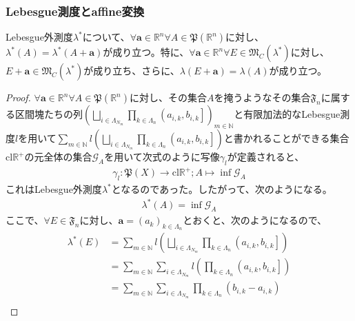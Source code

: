 \documentclass[dvipdfmx]{jsarticle}
\begin{document}
\subsubsection{Lebesgue測度とaffine変換}%
\begin{thm}\label{4.5.4.20}
Lebesgue外測度$\lambda^{*}$について、$\forall\mathbf{a} \in \mathbb{R}^{n}\forall A \in \mathfrak{P}\left( \mathbb{R}^{n} \right)$に対し、$\lambda^{*}(A) = \lambda^{*}\left( A + \mathbf{a} \right)$が成り立つ。特に、$\forall\mathbf{a} \in \mathbb{R}^{n}\forall E \in \mathfrak{M}_{C}\left( \lambda^{*} \right)$に対し、$E + \mathbf{a} \in \mathfrak{M}_{C}\left( \lambda^{*} \right)$が成り立ち、さらに、$\lambda\left( E + \mathbf{a} \right) = \lambda(A)$が成り立つ。
\end{thm}
\begin{proof}
$\forall\mathbf{a} \in \mathbb{R}^{n}\forall A \in \mathfrak{P}\left( \mathbb{R}^{n} \right)$に対し、その集合$A$を掩うようなその集合$\mathfrak{F}_{n}$に属する区間塊たちの列$\left( \bigsqcup_{i \in \varLambda_{N_{m}}} {\prod_{k \in \varLambda_{n}} \left( a_{i,k},b_{i,k} \right]} \right)_{m \in \mathbb{N}}$と有限加法的なLebesgue測度$l$を用いて$\sum_{m \in \mathbb{N}} {l\left( \bigsqcup_{i \in \varLambda_{N_{m}}} {\prod_{k \in \varLambda_{n}} \left( a_{i,k},b_{i,k} \right]} \right)}$と書かれることができる集合$\mathrm{cl}\mathbb{R}^{+}$の元全体の集合$\mathcal{G}_{A}$を用いて次式のように写像$\gamma_{l}$が定義されると、
\begin{align*}
\gamma_{l}\mathfrak{:P}(X) \rightarrow \mathrm{cl}\mathbb{R}^{+};A \mapsto \inf\mathcal{G}_{A}
\end{align*}
これはLebesgue外測度$\lambda^{*}$となるのであった。したがって、次のようになる。
\begin{align*}
\lambda^{*}(A) = \inf\mathcal{G}_{A}
\end{align*}
ここで、$\forall E \in \mathfrak{F}_{n}$に対し、$\mathbf{a} = \left( a_{k} \right)_{k \in \varLambda_{n}}$とおくと、次のようになるので、
\begin{align*}
\lambda^{*}(E) &= \sum_{m \in \mathbb{N}} {l\left( \bigsqcup_{i \in \varLambda_{N_{m}}} {\prod_{k \in \varLambda_{n}} \left( a_{i,k},b_{i,k} \right]} \right)}\\
&= \sum_{m \in \mathbb{N}} {\sum_{i \in \varLambda_{N_{m}}} {l\left( \prod_{k \in \varLambda_{n}} \left( a_{i,k},b_{i,k} \right] \right)}}\\
&= \sum_{m \in \mathbb{N}} {\sum_{i \in \varLambda_{N_{m}}} {\prod_{k \in \varLambda_{n}} \left( b_{i,k} - a_{i,k} \right)}}\\

\end{align*}
\end{proof}
\end{document}
